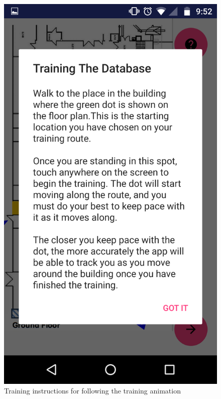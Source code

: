 \documentclass[10.8pt]{article}
\begin{document}
\vspace{1em}

\begin{figure}[H]
    \centering
    \begin{minipage}[b]{.3\textwidth} 
        \centering  
        \includegraphics[scale=1.2, width=\linewidth]{pic6.png}     
        \caption{Training instructions for following the training animation}  
        \label{fig:1}
    \end{minipage}    
    \hfill

\end{figure}
\end{document}
